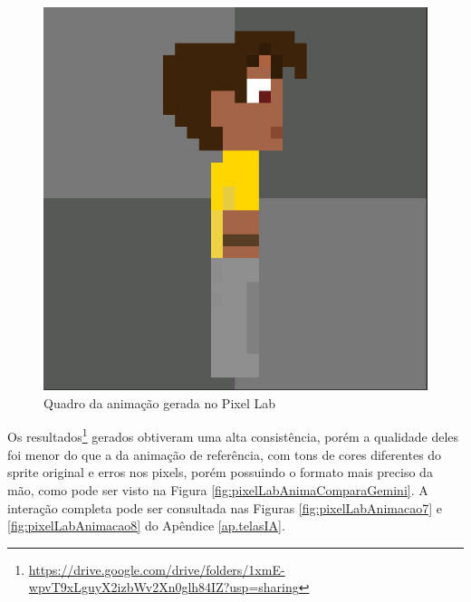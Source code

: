 \begin{figure}[htbp]
    \centering
    \caption{\small Quadro da animação gerada no Pixel Lab}
    \label{fig:pixelLabAniSideViewSprite2}
    \includegraphics[width=0.4\linewidth]{figs/pixelLab/dia3/fix_oficial_fundo_igual.PNG}
\end{figure}

Os resultados\footnote{\url{https://drive.google.com/drive/folders/1xmE-wpvT9xLguyX2izbWv2Xn0glh84IZ?usp=sharing}} gerados obtiveram uma alta consistência, porém a qualidade deles foi menor do que a da animação de referência, com tons de cores diferentes do sprite original e erros nos pixels, porém possuindo o formato mais preciso da mão, como pode ser visto na Figura \ref{fig:pixelLabAnimaComparaGemini}. A interação completa pode ser consultada nas Figuras \ref{fig:pixelLabAnimacao7} e \ref{fig:pixelLabAnimacao8} do Apêndice \ref{ap.telasIA}. 

